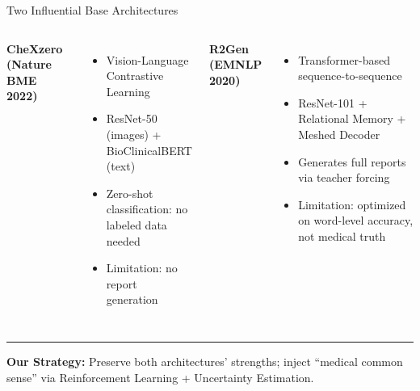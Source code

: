 \documentclass[aspectratio=169]{beamer}
\begin{document}
\begin{frame}{Two Influential Base Architectures}
  
  \begin{columns}
    \textbf{CheXzero (Nature BME 2022)}
    \begin{itemize}
      \item Vision-Language Contrastive Learning
      \item ResNet-50 (images) + BioClinicalBERT (text)
      \item Zero-shot classification: no labeled data needed
      \item Limitation: no report generation
    \end{itemize}
    
    \textbf{R2Gen (EMNLP 2020)}
    \begin{itemize}
      \item Transformer-based sequence-to-sequence
      \item ResNet-101 + Relational Memory + Meshed Decoder
      \item Generates full reports via teacher forcing
      \item Limitation: optimized on word-level accuracy, not medical truth
    \end{itemize}
  \end{columns}
  
  \vspace{0.5cm}
  \hrule
  \vspace{0.5cm}
  
  \textbf{Our Strategy:} Preserve both architectures' strengths; inject ``medical common sense'' via Reinforcement Learning + Uncertainty Estimation.
  
\end{frame}
\end{document}
